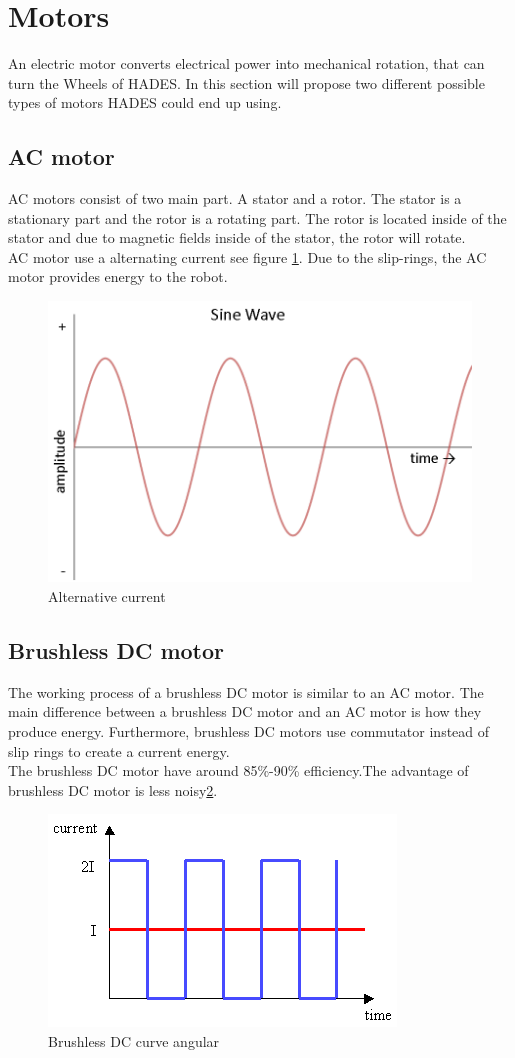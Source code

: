 \section{Motors}
An electric motor converts electrical power into mechanical rotation, that can turn the Wheels of HADES.
In this section will propose two different possible types of motors HADES could end up using.

\subsection{AC motor}
AC motors consist of two main part. A stator and a rotor. The stator is a stationary part and the rotor is a rotating part. The rotor is located inside of the stator and due to magnetic fields inside of the stator, the rotor will rotate\cite{motor21}.\\ 
AC motor use a alternating current see figure \ref{fig:ACmotor}. Due to the slip-rings, the AC motor provides energy to the robot\cite{motor21}.

\begin{figure}[h]
    \centering
    \includegraphics[width=.6\linewidth]{figures/wave.png}
    \caption{Alternative current\cite{ACmotor3}}
    \label{fig:ACmotor}
\end{figure}

\subsection{Brushless DC motor}
The working process of a brushless DC motor is similar to an AC motor. The main difference between a brushless DC motor and an AC motor is how they produce energy. Furthermore, brushless DC motors use commutator instead of slip rings to create a current energy.\\ 
The brushless DC motor have around 85\%-90\% efficiency.The advantage of brushless DC motor is less noisy\ref{fig:DCmotor}\cite{DCbrusshles}.

\begin{figure}[h]
    \centering    \includegraphics[width=.6\linewidth]{figures/dcMotor.png}
    \caption{Brushless DC curve angular\cite{Graphdd}}
    \label{fig:DCmotor}
\end{figure}

